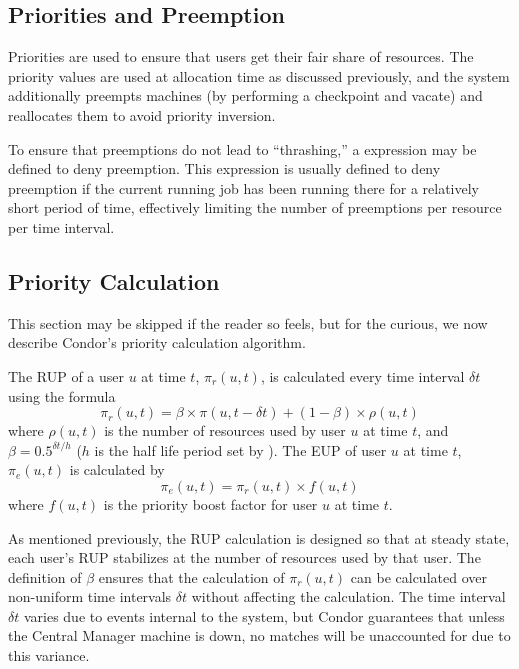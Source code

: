 \subsection{Priorities and Preemption}
Priorities are used to ensure that users get their fair share of resources.  
The priority values are used at allocation time as discussed previously, and
the system additionally preempts machines (by performing a checkpoint and
vacate) and reallocates them to avoid priority inversion.

To ensure that preemptions do not lead to ``thrashing,'' a 
 expression may be defined to deny preemption.  This
expression is usually defined to deny preemption if the current running job
has been running there for a relatively short period of time, effectively
limiting the number of preemptions per resource per time interval.

\subsection{Priority Calculation}
This section may be skipped if the reader so feels, but for the curious,
we now describe Condor's priority calculation algorithm.

The RUP of a user $u$ at time $t$, $\pi_r(u,t)$, is calculated 
every time interval $\delta t$ using the formula 
$$\pi_r(u,t) = \beta\times\pi(u,t-\delta t) + (1-\beta)\times\rho(u,t)$$
where $\rho(u,t)$ is the number of resources used by user $u$ at time $t$,
and $\beta=0.5^{{\delta t}/h}$ ($h$ is the half life period set by 
).  The EUP of user $u$ at time $t$, $\pi_e(u,t)$
is calculated by
$$\pi_e(u,t) = \pi_r(u,t)\times f(u,t)$$
where $f(u,t)$ is the priority boost factor for user $u$ at time $t$.

As mentioned previously, the RUP calculation is designed so that at steady
state, each user's RUP stabilizes at the number of resources used by that user. 
The definition of $\beta$ ensures that the calculation of $\pi_r(u,t)$ can be 
calculated over non-uniform time intervals $\delta t$ without affecting the 
calculation.  The time interval $\delta t$ varies due to events internal to 
the system, but Condor guarantees that unless the Central Manager machine is 
down, no matches will be unaccounted for due to this variance.
